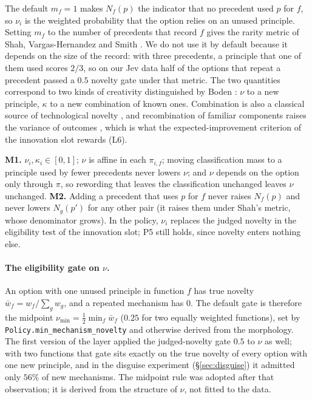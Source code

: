 \documentclass[11pt]{article}
\theoremstyle{definition}
\begin{document}
The default $m_f=1$ makes $N_f(p)$ the indicator that no precedent used $p$ for $f$, so $\nu_i$ is
the weighted probability that the option relies on an unused principle. Setting $m_f$ to the
number of precedents that record $f$ gives the rarity metric of Shah, Vargas-Hernandez and Smith
\cite{shah2003}. We do not use it by default because it depends on the size of the record: with
three precedents, a principle that one of them used scores $2/3$, so on our Jev data half of the
options that repeat a precedent passed a $0.5$ novelty gate under that metric. The two quantities
correspond to two kinds of creativity distinguished by Boden \cite{boden2004}: $\nu$ to a new
principle, $\kappa$ to a new combination of known ones. Combination is also a classical source of
technological novelty \cite{arthur2009,fleming2001}, and recombination of familiar components
raises the variance of outcomes \cite{fleming2001}, which is what the expected-improvement
criterion of the innovation slot rewards (L6).

\textbf{M1.} $\nu_i,\kappa_i\in[0,1]$; $\nu$ is affine in each $\pi_{i,f}$; moving
classification mass to a principle used by fewer precedents never lowers $\nu$; and $\nu$ depends
on the option only through $\pi$, so rewording that leaves the classification unchanged leaves
$\nu$ unchanged. \textbf{M2.} Adding a precedent that uses $p$ for $f$ never raises $N_f(p)$ and
never lowers $N_g(p')$ for any other pair (it raises them under Shah's metric, whose denominator
grows). In the policy, $\nu_i$ replaces the judged novelty in the eligibility test of the
innovation slot; P5 still holds, since novelty enters nothing else.

\paragraph{The eligibility gate on $\nu$.} An option with one unused principle in function $f$ has
true novelty $\bar w_f=w_f/\sum_g w_g$, and a repeated mechanism has $0$. The default gate is therefore
the midpoint $\nu_{\min}=\tfrac12\min_f\bar w_f$ ($0.25$ for two equally weighted functions), set by
\texttt{Policy.min\_mechanism\_novelty} and otherwise derived from the morphology. The first version of
the layer applied the judged-novelty gate $0.5$ to $\nu$ as well; with two functions that gate sits exactly on
the true novelty of every option with one new principle, and in the disguise experiment
(\S\ref{sec:disguise}) it admitted only $56\%$ of new mechanisms. The midpoint rule was adopted after
that observation; it is derived from the structure of $\nu$, not fitted to the data.
\end{document}
